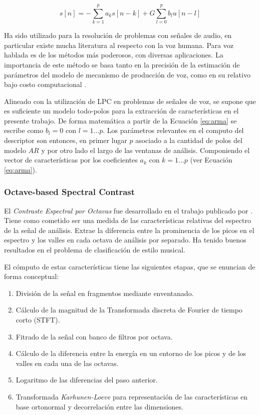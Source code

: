 \documentclass{article}
\begin{document}
\begin{equation}
\label{eq:arma}
s[n]=-\sum_{k=1}^p a_ks[n-k]+G\sum_{l=0}^p b_lu[n-l]
\end{equation}

Ha sido utilizado para la resolución de problemas con señales de audio, en particular existe mucha literatura al respecto con la voz humana. Para voz hablada es de los métodos más poderosos, con diversas aplicaciones. La importancia de este método se basa tanto en la precisión de la estimación de parámetros del modelo de mecanismo de producción de voz, como en su relativo bajo costo computacional \citep[Capítulos~3 y 9]{rabiner1978digital}. 
\medskip

Alineado con la utilización de LPC en problemas de señales de voz, se supone que es suficiente un modelo todo-polos para la extracción de características en el presente trabajo. De forma matemática a partir de la Ecuación \ref{eq:arma} se escribe como $b_l=0$ con $l=1...p$. Los parámetros relevantes en el computo del descriptor son entonces, en primer lugar $p$ asociado a la cantidad de polos del modelo $AR$ y por otro lado el largo de las ventanas de análisis. Componiendo el vector de características por los coeficientes $a_k$ con $k=1...p$ (ver Ecuación \ref{eq:arma}).

\subsubsection{Octave-based Spectral Contrast}

El \textit{Contraste Espectral por Octavas} fue desarrollado en el trabajo publicado por \cite{jiang2002music}. Tiene como cometido ser una medida de las características relativas del espectro de la señal de análisis. Extrae la diferencia entre la prominencia de los picos en el espectro y los valles en cada octava de análisis por separado. Ha tenido buenos resultados en el problema de clasificación de estilo musical.
\medskip

El cómputo de estas características tiene las siguientes etapas, que se enuncian de forma conceptual:

\begin{enumerate}
	\item División de la señal en fragmentos mediante enventanado.
	\item Cálculo de la magnitud de la Transformada discreta de Fourier de tiempo corto (STFT).
	\item Fitrado de la señal con banco de filtros por octava.
	\item Cálculo de la diferencia entre la energía en un entorno de los picos y de los valles en cada una de las octavas.
	\item Logaritmo de las diferencias del paso anterior.
	\item Transformada \textit{Karhunen-Loeve} para representación de las características en base ortonormal y decorrelación entre las dimensiones.
\end{enumerate}
\end{document}
